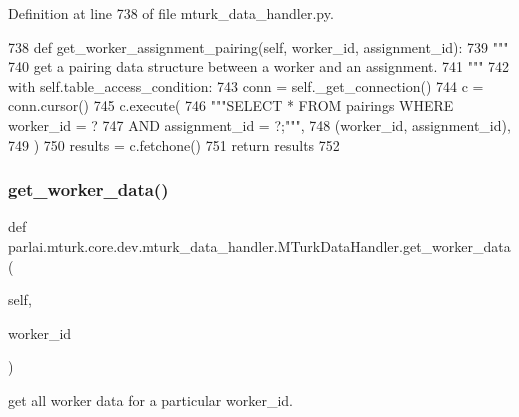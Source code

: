 Definition at line 738 of file mturk\+\_\+data\+\_\+handler.\+py.


\begin{DoxyCode}
738     \textcolor{keyword}{def }get\_worker\_assignment\_pairing(self, worker\_id, assignment\_id):
739         \textcolor{stringliteral}{"""}
740 \textcolor{stringliteral}{        get a pairing data structure between a worker and an assignment.}
741 \textcolor{stringliteral}{        """}
742         with self.table\_access\_condition:
743             conn = self.\_get\_connection()
744             c = conn.cursor()
745             c.execute(
746                 \textcolor{stringliteral}{"""SELECT * FROM pairings WHERE worker\_id = ?}
747 \textcolor{stringliteral}{                         AND assignment\_id = ?;"""},
748                 (worker\_id, assignment\_id),
749             )
750             results = c.fetchone()
751             \textcolor{keywordflow}{return} results
752 
\end{DoxyCode}
\mbox{\label{classparlai_1_1mturk_1_1core_1_1dev_1_1mturk__data__handler_1_1MTurkDataHandler_a748e6271a1618272cd17ec412b2c2a25}} 
\subsubsection{\texorpdfstring{get\+\_\+worker\+\_\+data()}{get\_worker\_data()}}
{\footnotesize\ttfamily def parlai.\+mturk.\+core.\+dev.\+mturk\+\_\+data\+\_\+handler.\+M\+Turk\+Data\+Handler.\+get\+\_\+worker\+\_\+data (\begin{DoxyParamCaption}\item[{}]{self,  }\item[{}]{worker\+\_\+id }\end{DoxyParamCaption})}

\begin{DoxyVerb}get all worker data for a particular worker_id.
\end{DoxyVerb}
 


